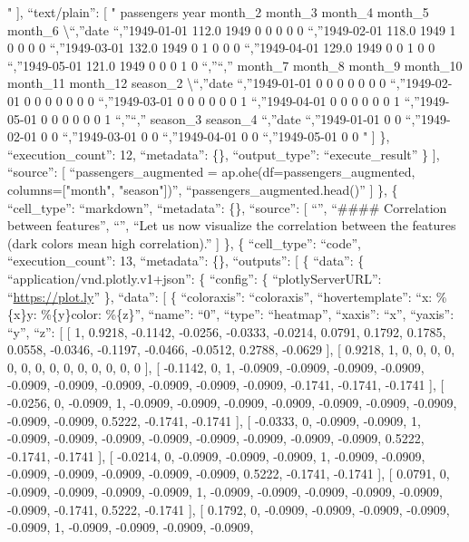 \documentclass[
]{article}
\begin{document}
" {]}, ``text/plain'': {[} " passengers year month\_2 month\_3 month\_4
month\_5 month\_6 \textbackslash{}\n``,''date \n``,''1949-01-01 112.0
1949 0 0 0 0 0 \n``,''1949-02-01 118.0 1949 1 0 0 0 0 \n``,''1949-03-01
132.0 1949 0 1 0 0 0 \n``,''1949-04-01 129.0 1949 0 0 1 0 0
\n``,''1949-05-01 121.0 1949 0 0 0 1 0 \n``,''\n``,'' month\_7 month\_8
month\_9 month\_10 month\_11 month\_12 season\_2
\textbackslash{}\n``,''date \n``,''1949-01-01 0 0 0 0 0 0 0
\n``,''1949-02-01 0 0 0 0 0 0 0 \n``,''1949-03-01 0 0 0 0 0 0 1
\n``,''1949-04-01 0 0 0 0 0 0 1 \n``,''1949-05-01 0 0 0 0 0 0 1
\n``,''\n``,'' season\_3 season\_4 \n``,''date \n``,''1949-01-01 0 0
\n``,''1949-02-01 0 0 \n``,''1949-03-01 0 0 \n``,''1949-04-01 0 0
\n``,''1949-05-01 0 0 " {]} \}, ``execution\_count'': 12, ``metadata'':
\{\}, ``output\_type'': ``execute\_result'' \} {]}, ``source'': {[}
``passengers\_augmented = ap.ohe(df=passengers\_augmented,
columns={[}"month", "season"{]})\n'', ``passengers\_augmented.head()\n''
{]} \}, \{ ``cell\_type'': ``markdown'', ``metadata'': \{\}, ``source'':
{[} ``\n'', ``\#\#\#\# Correlation between features\n'', ``\n'', ``Let
us now visualize the correlation between the features (dark colors mean
high correlation).'' {]} \}, \{ ``cell\_type'': ``code'',
``execution\_count'': 13, ``metadata'': \{\}, ``outputs'': {[} \{
``data'': \{ ``application/vnd.plotly.v1+json'': \{ ``config'': \{
``plotlyServerURL'': ``\url{https://plot.ly}'' \}, ``data'': {[} \{
``coloraxis'': ``coloraxis'', ``hovertemplate'': ``x: \%\{x\}y:
\%\{y\}color: \%\{z\}'', ``name'': ``0'', ``type'': ``heatmap'',
``xaxis'': ``x'', ``yaxis'': ``y'', ``z'': {[} {[} 1, 0.9218, -0.1142,
-0.0256, -0.0333, -0.0214, 0.0791, 0.1792, 0.1785, 0.0558, -0.0346,
-0.1197, -0.0466, -0.0512, 0.2788, -0.0629 {]}, {[} 0.9218, 1, 0, 0, 0,
0, 0, 0, 0, 0, 0, 0, 0, 0, 0, 0 {]}, {[} -0.1142, 0, 1, -0.0909,
-0.0909, -0.0909, -0.0909, -0.0909, -0.0909, -0.0909, -0.0909, -0.0909,
-0.0909, -0.1741, -0.1741, -0.1741 {]}, {[} -0.0256, 0, -0.0909, 1,
-0.0909, -0.0909, -0.0909, -0.0909, -0.0909, -0.0909, -0.0909, -0.0909,
-0.0909, 0.5222, -0.1741, -0.1741 {]}, {[} -0.0333, 0, -0.0909, -0.0909,
1, -0.0909, -0.0909, -0.0909, -0.0909, -0.0909, -0.0909, -0.0909,
-0.0909, 0.5222, -0.1741, -0.1741 {]}, {[} -0.0214, 0, -0.0909, -0.0909,
-0.0909, 1, -0.0909, -0.0909, -0.0909, -0.0909, -0.0909, -0.0909,
-0.0909, 0.5222, -0.1741, -0.1741 {]}, {[} 0.0791, 0, -0.0909, -0.0909,
-0.0909, -0.0909, 1, -0.0909, -0.0909, -0.0909, -0.0909, -0.0909,
-0.0909, -0.1741, 0.5222, -0.1741 {]}, {[} 0.1792, 0, -0.0909, -0.0909,
-0.0909, -0.0909, -0.0909, 1, -0.0909, -0.0909, -0.0909, -0.0909,
\end{document}
